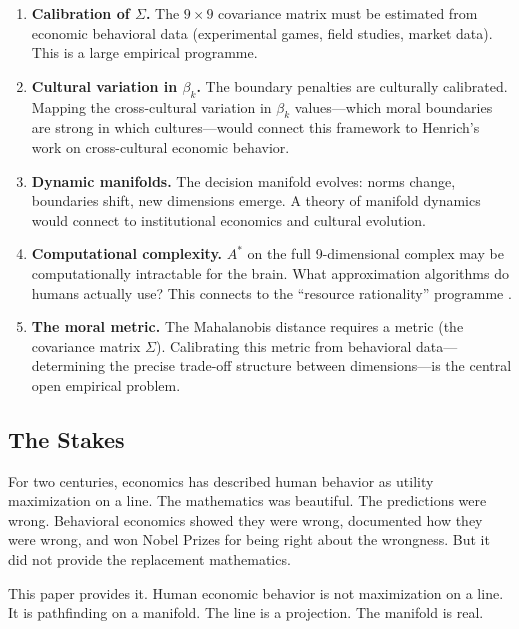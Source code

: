 \documentclass[12pt]{article}
\theoremstyle{definition}
\theoremstyle{remark}
\begin{document}
\begin{enumerate}
    \item \textbf{Calibration of $\Sigma$.}  The $9 \times 9$ covariance matrix must be estimated from economic behavioral data (experimental games, field studies, market data).  This is a large empirical programme.

    \item \textbf{Cultural variation in $\beta_k$.}  The boundary penalties are culturally calibrated.  Mapping the cross-cultural variation in $\beta_k$ values---which moral boundaries are strong in which cultures---would connect this framework to Henrich's \cite{henrich2010} work on cross-cultural economic behavior.

    \item \textbf{Dynamic manifolds.}  The decision manifold evolves: norms change, boundaries shift, new dimensions emerge.  A theory of manifold dynamics would connect to institutional economics and cultural evolution.

    \item \textbf{Computational complexity.}  $A^*$ on the full 9-dimensional complex may be computationally intractable for the brain.  What approximation algorithms do humans actually use?  This connects to the ``resource rationality'' programme \cite{lieder2020}.

    \item \textbf{The moral metric.}  The Mahalanobis distance requires a metric (the covariance matrix $\Sigma$).  Calibrating this metric from behavioral data---determining the precise trade-off structure between dimensions---is the central open empirical problem.
\end{enumerate}

\subsection{The Stakes}

For two centuries, economics has described human behavior as utility maximization on a line.  The mathematics was beautiful.  The predictions were wrong.  Behavioral economics showed they were wrong, documented how they were wrong, and won Nobel Prizes for being right about the wrongness.  But it did not provide the replacement mathematics.

This paper provides it.  Human economic behavior is not maximization on a line.  It is pathfinding on a manifold.  The line is a projection.  The manifold is real.
\end{document}
